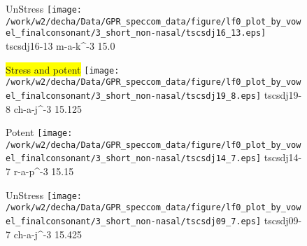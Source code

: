 \documentclass{article}
\begin{document}
\begin{figure}[t]
\begin{minipage}[b]{.24\textwidth}
UnStress
\centering
\texttt{[image: /work/w2/decha/Data/GPR\_speccom\_data/figure/lf0\_plot\_by\_vowel\_finalconsonant/3\_short\_non-nasal/tscsdj16\_13.eps]}
tscsdj16-13 m-a-k\textasciicircum-3 15.0
\end{minipage}
\begin{minipage}[b]{.24\textwidth}
\colorbox{yellow}{Stress and potent}
\centering
\texttt{[image: /work/w2/decha/Data/GPR\_speccom\_data/figure/lf0\_plot\_by\_vowel\_finalconsonant/3\_short\_non-nasal/tscsdj19\_8.eps]}
tscsdj19-8 ch-a-j\textasciicircum-3 15.125
\end{minipage}
\begin{minipage}[b]{.24\textwidth}
\colorbox{Apricot}{Potent}
\centering
\texttt{[image: /work/w2/decha/Data/GPR\_speccom\_data/figure/lf0\_plot\_by\_vowel\_finalconsonant/3\_short\_non-nasal/tscsdj14\_7.eps]}
tscsdj14-7 r-a-p\textasciicircum-3 15.15
\end{minipage}
\begin{minipage}[b]{.24\textwidth}
UnStress
\centering
\texttt{[image: /work/w2/decha/Data/GPR\_speccom\_data/figure/lf0\_plot\_by\_vowel\_finalconsonant/3\_short\_non-nasal/tscsdj09\_7.eps]}
tscsdj09-7 ch-a-j\textasciicircum-3 15.425
\end{minipage}
\end{figure}
\end{document}
